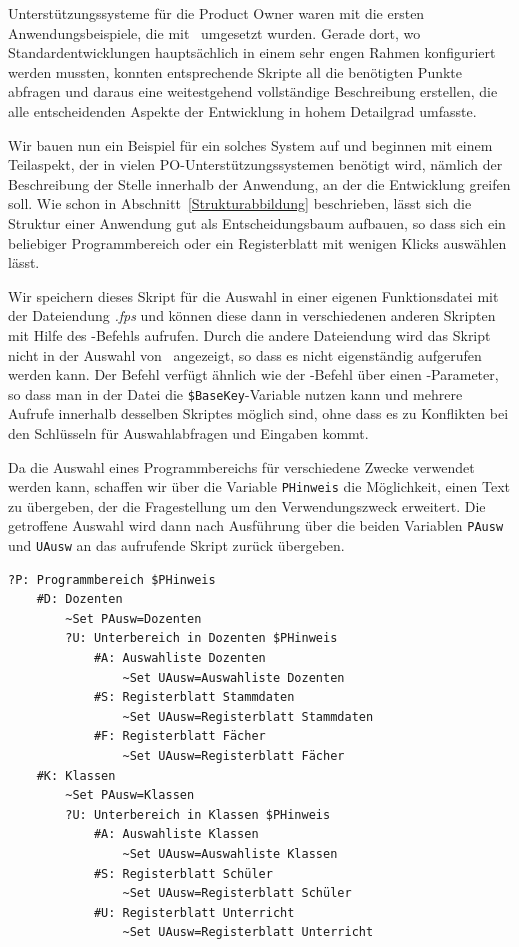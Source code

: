Unterstützungssysteme für die Product Owner waren mit die ersten Anwendungsbeispiele, die mit \FPZ\ umgesetzt wurden. Gerade dort, wo Standardentwicklungen hauptsächlich in einem sehr engen Rahmen konfiguriert werden mussten, konnten entsprechende Skripte all die benötigten Punkte abfragen und daraus eine weitestgehend vollständige Beschreibung erstellen, die alle entscheidenden Aspekte der Entwicklung in hohem Detailgrad umfasste.

Wir bauen nun ein Beispiel für ein solches System auf und beginnen mit einem Teilaspekt, der in vielen PO-Unterstützungssystemen benötigt wird, nämlich der Beschreibung der Stelle innerhalb der Anwendung, an der die Entwicklung greifen soll. Wie schon in Abschnitt~\ref{Strukturabbildung} beschrieben, lässt sich die Struktur einer Anwendung gut als Entscheidungsbaum aufbauen, so dass sich ein beliebiger Programmbereich oder ein Registerblatt mit wenigen Klicks auswählen lässt.

Wir speichern dieses Skript für die Auswahl in einer eigenen Funktionsdatei mit der Dateiendung \emph{.fps} und können diese dann in verschiedenen anderen Skripten mit Hilfe des -Befehls aufrufen. Durch die andere Dateiendung wird das Skript nicht in der Auswahl von \FPZ\ angezeigt, so dass es nicht eigenständig aufgerufen werden kann. Der Befehl verfügt ähnlich wie der -Befehl über einen -Parameter, so dass man in der Datei die \verb|$BaseKey|-Variable nutzen kann und mehrere Aufrufe innerhalb desselben Skriptes möglich sind, ohne dass es zu Konflikten bei den Schlüsseln für Auswahlabfragen und Eingaben kommt.

Da die Auswahl eines Programmbereichs für verschiedene Zwecke verwendet werden kann, schaffen wir über die Variable \verb|PHinweis| die Möglichkeit, einen Text zu übergeben, der die Fragestellung um den Verwendungszweck erweitert. Die getroffene Auswahl wird dann nach Ausführung über die beiden Variablen \verb|PAusw| und \verb|UAusw| an das aufrufende Skript zurück übergeben.

\label{BspProgrammauswahl}
\begin{verbatim}
?P: Programmbereich $PHinweis
    #D: Dozenten
        ~Set PAusw=Dozenten
        ?U: Unterbereich in Dozenten $PHinweis
            #A: Auswahliste Dozenten
                ~Set UAusw=Auswahliste Dozenten
            #S: Registerblatt Stammdaten
                ~Set UAusw=Registerblatt Stammdaten
            #F: Registerblatt Fächer
                ~Set UAusw=Registerblatt Fächer
    #K: Klassen
        ~Set PAusw=Klassen
        ?U: Unterbereich in Klassen $PHinweis
            #A: Auswahliste Klassen
                ~Set UAusw=Auswahliste Klassen
            #S: Registerblatt Schüler
                ~Set UAusw=Registerblatt Schüler
            #U: Registerblatt Unterricht
                ~Set UAusw=Registerblatt Unterricht
\end{verbatim}

